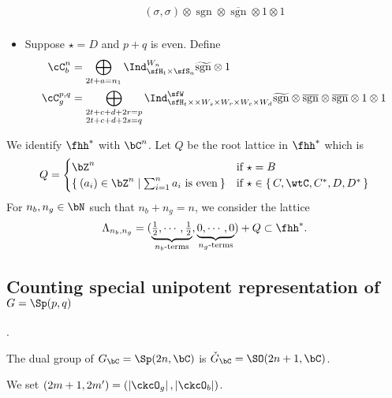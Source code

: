 \documentclass[12pt,a4paper]{amsart}
\def\abs#1{\left|{#1}\right|}
\newcommand{\sgn}{\operatorname{sgn}}
\numberwithin{equation}{section}
\theoremstyle{remark}
\def\half{{\tfrac{1}{2}}}
\def\ckGc{\check{G}_{\bC}}
\def\lamck{\lambda_\ckcO}
\def\Cint#1{\Coh_{[#1]}}
\def\Gc{G_\bC}
\def\Coh{\mathrm{Coh}}
\def\hsgn{\widetilde{\mathrm{sgn}}}
\def\bsgn{\overline{\sgn}}
\begin{document}
\begin{itemize}
\[\begin{split}
      (\sigma,\sigma)\otimes \sgn \otimes \bsgn \otimes 1\otimes 1 \\
    \end{split}
  \]
  \item Suppose $\star=D$ and $p+q$ is even. Define
  \[
    \begin{split}
    \cC_b^{n} & =
      \bigoplus_{\substack{2t+a=n_{1}}}
      \Ind_{\sfH_{t}\times \sfS_{a}}^{W_{n}} \hsgn\otimes 1\\
      \cC_g^{p,q} %
      &=\bigoplus_{\substack{2t+c+d+2r=p\\2t+c+d+2s=q}} \Ind_{\sfH_{t} \times \times W_s\times W_r\times W_{c}\times W_{d} }^{\sfW_{}}
      \hsgn \otimes \bsgn \otimes \bsgn \otimes 1\otimes 1\\
    \end{split}
  \]
\end{itemize}


We identify $\fhh^{*}$ with $\bC^{n}$.
Let $Q$ be the root lattice in $\fhh^{*}$
which is
\[
Q = \begin{cases}
  \bZ^{n} & \text{if  $\star = B$}\\
  \Set{(a_{i})\in \bZ^{n}|\sum_{i=1}^{n}a_{i} \text{ is even}}
    & \text{if  $\star \in \set{C,\wtC,C^{*},D,D^{*}}$}\\
\end{cases}
\]
For $n_{b}, n_{g}\in \bN$ such that $n_{b}+n_{g}=n$, we consider the lattice
\[
  \Lambda_{n_{b},n_{g}} =
  (\underbrace{\half, \cdots, \half}_{n_{b}\text{-terms}}, \underbrace{0, \cdots, 0}_{n_{g}\text{-terms}}) + Q \subset \fhh^{*}.
\]


\subsection{Counting special unipotent representation of $G=\Sp(p,q)$}.

The dual group of $\Gc = \Sp(2n,\bC)$ is $\ckGc = \SO(2n+1,\bC)$.

We set $(2m+1,2m') = (\abs{\ckcO_g},\abs{\ckcO_b})$.

\end{document}
